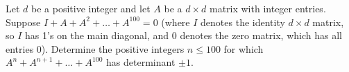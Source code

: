Let $d$ be a positive integer and let $A$ be a $d \times d$ matrix with integer
entries. Suppose $I + A + A^2 + \dots + A^{100} = 0$ (where $I$ denotes the
identity $d \times d$ matrix, so $I$ has 1's on the main diagonal, and $0$
denotes the zero matrix, which has all entries 0). Determine the positive
integers $n \leq 100$ for which $A^n + A^{n+1} + \dots + A^{100}$ has
determinant $\pm 1$.
